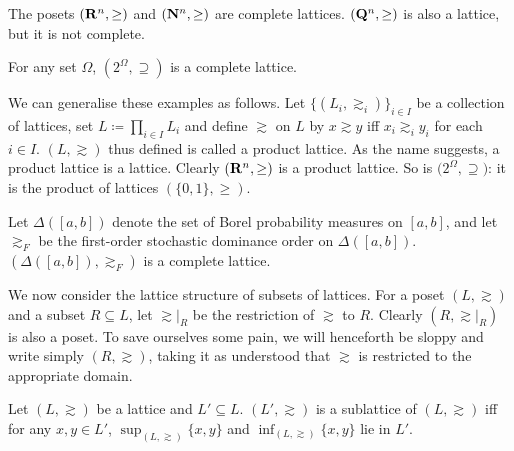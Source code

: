 \documentclass[11pt,letterpaper,reqno,oneside]{article}
\begin{document}
\begin{example}
	The posets $\left(\mathbf{R}^n,\geq\right)$ and $(\mathbf{N}^n,\geq)$ are complete lattices. $(\mathbf{Q}^n,\geq)$ is also a lattice, but it is not complete.
\end{example}

\begin{example}
	For any set $\Omega$, $\left( 2^\Omega, \supseteq \right)$ is a complete lattice.
\end{example}

We can generalise these examples as follows. Let $\{ (L_i,\gtrsim_i) \}_{i \in I}$ be a collection of lattices, set $L \coloneqq \prod_{i \in I} L_i$ and define $\gtrsim$ on $L$ by $x \gtrsim y$ iff $x_i \gtrsim_i y_i$ for each $i \in I$. $(L,\gtrsim)$ thus defined is called a product lattice. As the name suggests, a product lattice is a lattice. Clearly $\left(\mathbf{R}^n,\geq\right)$ is a product lattice. So is $\bigl( 2^\Omega, \supseteq \bigr)$: it is the product of lattices $(\{0,1\},\geq)$.

\begin{example}
	Let $\Delta([a,b])$ denote the set of Borel probability measures on $[a,b]$, and let $\gtrsim_F$ be the first-order stochastic dominance order on $\Delta([a,b])$. $\left( \Delta([a,b]), \gtrsim_F \right)$ is a complete lattice.
\end{example}


We now consider the lattice structure of subsets of lattices. For a poset $(L,\gtrsim)$ and a subset $R \subseteq L$, let $\gtrsim|_R$ be the restriction of $\gtrsim$ to $R$. Clearly $(R,\gtrsim|_R)$ is also a poset. To save ourselves some pain, we will henceforth be sloppy and write simply $(R,\gtrsim)$, taking it as understood that $\gtrsim$ is restricted to the appropriate domain.
%
\begin{definition}
	Let $(L,\gtrsim)$ be a lattice and $L' \subseteq L$. $(L',\gtrsim)$ is a sublattice of $(L,\gtrsim)$ iff for any $x,y \in L'$, $\sup_{(L,\gtrsim)}\{x,y\}$ and $\inf_{(L,\gtrsim)}\{x,y\}$ lie in $L'$.
\end{definition}
\end{document}
